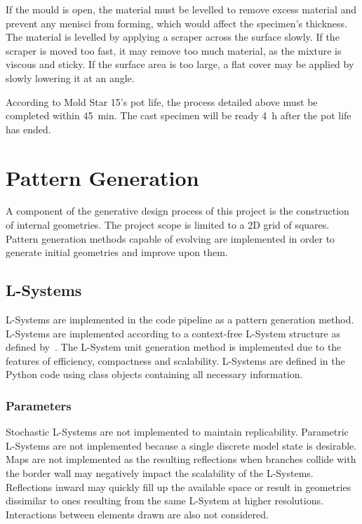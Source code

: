 If the mould is open, the material must be levelled to remove excess material and prevent any menisci from forming, which would affect the specimen's thickness. The material is levelled by applying a scraper across the surface slowly. If the scraper is moved too fast, it may remove too much material, as the mixture is viscous and sticky. If the surface area is too large, a flat cover may be applied by slowly lowering it at an angle.

According to Mold Star 15's pot life, the process detailed above must be completed within \SI{45}{\minute}. The cast specimen will be ready \SI{4}{\hour} after the pot life has ended.

\section{Pattern Generation}

A component of the generative design process of this project is the construction of internal geometries. The project scope is limited to a 2D grid of squares. Pattern generation methods capable of evolving are implemented in order to generate initial geometries and improve upon them.

\subsection{L-Systems}
\label{ssec:LS}

L-Systems are implemented in the code pipeline as a pattern generation method. L-Systems are implemented according to a context-free L-System structure as defined by~\cite{Prusinkiewicz2004}. The L-System unit generation method is implemented due to the features of efficiency, compactness and scalability. L-Systems are defined in the Python code using class objects containing all necessary information.

\subsubsection{Parameters}

Stochastic L-Systems are not implemented to maintain replicability. Parametric L-Systems are not implemented because a single discrete model state is desirable. Maps are not implemented as the resulting reflections when branches collide with the border wall may negatively impact the scalability of the L-Systems. Reflections inward may quickly fill up the available space or result in geometries dissimilar to ones resulting from the same L-System at higher resolutions. Interactions between elements drawn are also not considered.

